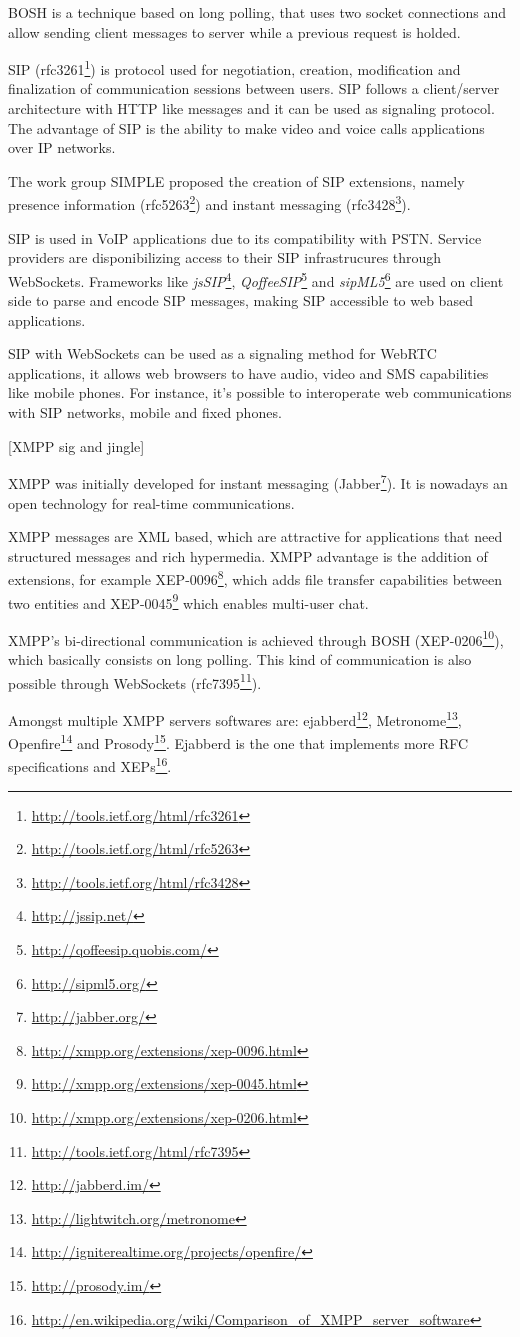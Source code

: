   \ac{BOSH} is a technique based on long polling, that uses two socket connections and allow sending client messages to server while a previous request is holded.

  \ac{SIP} (rfc3261\footnote{\url{http://tools.ietf.org/html/rfc3261}}) is protocol used for negotiation, creation, modification and finalization of communication sessions between users. \ac{SIP} follows a client/server architecture with \ac{HTTP} like messages and it can be used as signaling protocol. The advantage of \ac{SIP} is the ability to make video and voice calls applications over \ac{IP} networks.

  The work group \ac{SIMPLE} proposed the creation of \ac{SIP} extensions, namely presence information (rfc5263\footnote{\url{http://tools.ietf.org/html/rfc5263}}) and instant messaging (rfc3428\footnote{\url{http://tools.ietf.org/html/rfc3428}}).

  \ac{SIP} is used in \ac{VoIP} applications due to its compatibility with \ac{PSTN}. Service providers are disponibilizing access to their \ac{SIP} infrastrucures through WebSockets. Frameworks like \textit{jsSIP}\footnote{\url{http://jssip.net/}}, \textit{QoffeeSIP}\footnote{\url{http://qoffeesip.quobis.com/}} and \textit{sipML5}\footnote{\url{http://sipml5.org/}} are used on client side to parse and encode \ac{SIP} messages, making \ac{SIP} accessible to web based applications. 

  \ac{SIP} with WebSockets can be used as a signaling method for WebRTC applications, it allows web browsers to have audio, video and \ac{SMS} capabilities like mobile phones. For instance, it's possible to interoperate web communications with \ac{SIP} networks, mobile and fixed phones.

{\color{red}[XMPP sig and jingle]}

  \ac{XMPP} was initially developed for instant messaging (Jabber\footnote{\url{http://jabber.org/}}). It is nowadays an open technology for real-time communications. 

  \ac{XMPP} messages are \ac{XML} based, which are attractive for applications that need structured messages and rich hypermedia. \ac{XMPP} advantage is the addition of extensions, for example XEP-0096\footnote{\url{http://xmpp.org/extensions/xep-0096.html}}, which adds file transfer capabilities between two entities and XEP-0045\footnote{\url{http://xmpp.org/extensions/xep-0045.html}} which enables multi-user chat.

  \ac{XMPP}'s bi-directional communication is achieved through \ac{BOSH} (XEP-0206\footnote{\url{http://xmpp.org/extensions/xep-0206.html}}), which basically consists on long polling. This kind of communication is also possible through WebSockets (rfc7395\footnote{\url{http://tools.ietf.org/html/rfc7395}}).

  Amongst multiple XMPP servers softwares are: ejabberd\footnote{\url{http://jabberd.im/}}, Metronome\footnote{\url{http://lightwitch.org/metronome}}, Openfire\footnote{\url{http://igniterealtime.org/projects/openfire/}} and Prosody\footnote{\url{http://prosody.im/}}. Ejabberd is the one that implements more \ac{RFC} specifications and \ac{XEP}s\footnote{\url{http://en.wikipedia.org/wiki/Comparison_of_XMPP_server_software}}.

